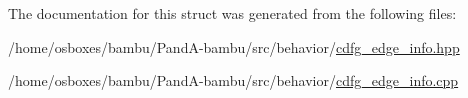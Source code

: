 The documentation for this struct was generated from the following files\+:\begin{DoxyCompactItemize}
\item 
/home/osboxes/bambu/\+Pand\+A-\/bambu/src/behavior/\hyperlink{cdfg__edge__info_8hpp}{cdfg\+\_\+edge\+\_\+info.\+hpp}\item 
/home/osboxes/bambu/\+Pand\+A-\/bambu/src/behavior/\hyperlink{cdfg__edge__info_8cpp}{cdfg\+\_\+edge\+\_\+info.\+cpp}\end{DoxyCompactItemize}
